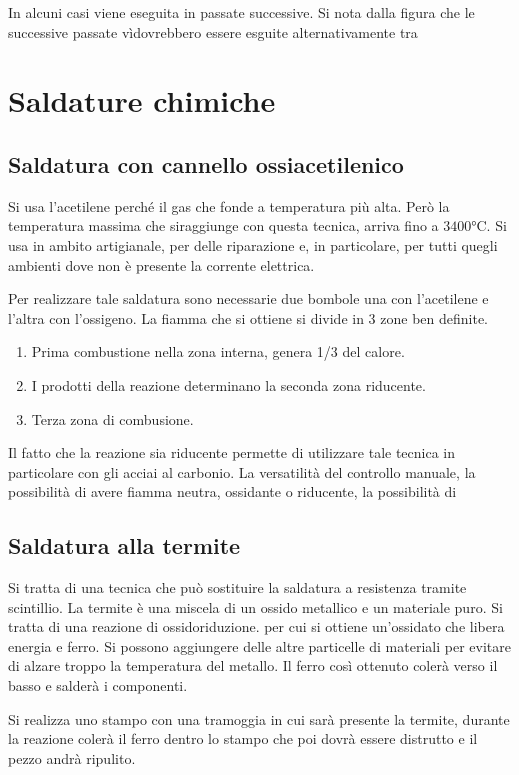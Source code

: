 In alcuni casi viene eseguita in passate successive.
Si nota dalla figura  che le successive passate vìdovrebbero essere esguite alternativamente tra 

\section{Saldature chimiche}
\subsection{Saldatura con cannello ossiacetilenico}
Si usa l'acetilene perché il gas che fonde a temperatura più alta.
Però la temperatura massima che siraggiunge con questa tecnica, arriva fino a $3400\unit{\celsius}$. Si usa in ambito artigianale, per delle riparazione e, in particolare, per tutti quegli ambienti dove non è presente la corrente elettrica.

Per realizzare tale saldatura sono necessarie due bombole una con l'acetilene e l'altra con l'ossigeno.
La fiamma che si ottiene si divide in 3 zone ben definite.
\begin{enumerate}
\item Prima combustione nella zona interna, genera 1/3 del calore.
\item I prodotti della reazione determinano la seconda zona riducente.
\item Terza zona di combusione.
\end{enumerate}

Il fatto che la reazione sia riducente permette di utilizzare tale tecnica in particolare con gli acciai al carbonio.
La versatilità del controllo manuale, la possibilità di avere fiamma neutra, ossidante o riducente, la possibilità di \moretodo{\\aggiungi}



\subsection{Saldatura alla termite}
Si tratta di una tecnica che può sostituire la saldatura a resistenza tramite scintillio.
La termite è una miscela di un ossido metallico e un materiale puro.
Si tratta di una reazione di ossidoriduzione. per cui si ottiene un'ossidato che libera energia e ferro. Si possono aggiungere delle altre particelle di materiali per evitare di alzare troppo la temperatura del metallo.
Il ferro così ottenuto colerà verso il basso e salderà i componenti.

Si realizza uno stampo con una tramoggia in cui sarà presente la termite, durante la reazione colerà il ferro dentro lo stampo che poi dovrà essere distrutto e il pezzo andrà ripulito.


